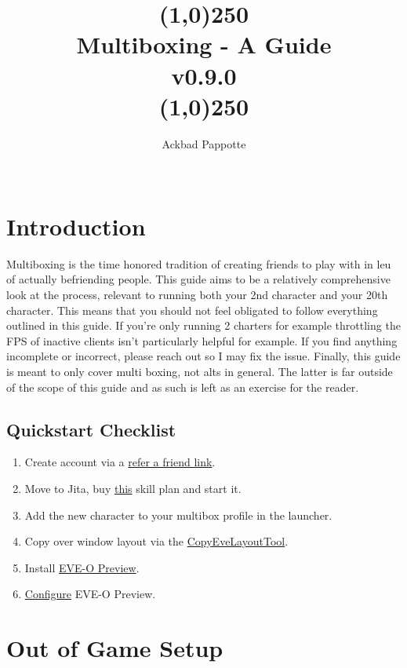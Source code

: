 \documentclass{article}
\title{
  \line(1,0){250} \\
  \textbf{Multiboxing - A Guide} \\
  v0.9.0 \\
  \line(1,0){250}
  }
\author{ 
  Ackbad Pappotte \\\
  }
\begin{document}



\maketitle

\section{Introduction}
Multiboxing is the time honored tradition of creating friends to play with in leu of actually befriending people. This guide aims to be a 
relatively comprehensive look at the process, relevant to running both your 2nd character and your 20th character. This means that you 
should not feel obligated to follow everything outlined in this guide. If you're only running 2 charters for example throttling the FPS of
inactive clients isn't particularly helpful for example. If you find anything incomplete or incorrect, please reach out so I may fix the
issue. Finally, this guide is meant to only cover multi boxing, not alts in general. The latter is far outside of the scope of this guide
and as such is left as an exercise for the reader.

\subsection{Quickstart Checklist}
\begin{enumerate}
  \item Create account via a \href{https://www.eveonline.com/signup?invc=79ffb3de-ef43-400b-a568-e45ac72c6715}{refer a friend link}.
  \item Move to Jita, buy \hyperref[skillplan]{this} skill plan and start it.
  \item Add the new character to your multibox profile in the launcher.
  \item Copy over window layout via the \href{https://github.com/kshannoninnes/CopyEveLayoutTool}{CopyEveLayoutTool}.
  \item Install \href{https://github.com/Proopai/eve-o-preview/releases}{EVE-O Preview}.
  \item \href{https://github.com/Proopai/eve-o-preview}{Configure} EVE-O Preview.
\end{enumerate}

\clearpage
\section{Out of Game Setup}
\end{document}

